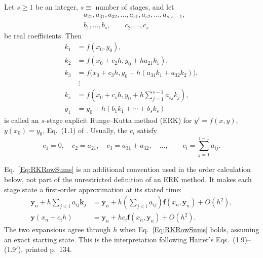 \begin{definition}
Let $s\geq1$ be an integer, $s\equiv$ number of stages, and let
\[
\begin{aligned}
 &a_{21},a_{31},a_{32},\dots,a_{s1},a_{s2},\dots,a_{s,s-1},\\
 &b_1,\dots,b_s,\qquad c_2,\dots,c_s
\end{aligned}
\]
be real coefficients. Then
\begin{equation}\label{Eq:ERKmethodsSthStage}
\begin{aligned}
 k_1&=f(x_0,y_0),\\
 k_2&=f(x_0+c_2h,y_0+ha_{21}k_1),\\
 k_3&=f\bigl(x_0+c_3h,y_0+h(a_{31}k_1+a_{32}k_2)\bigr),\\
 &\ \vdots\\
 k_s&=f\left(x_0+c_sh,y_0+h\sum_{j=1}^{s-1}a_{sj}k_j\right),\\
 y_1&=y_0+h(b_1k_1+\cdots+b_sk_s)
\end{aligned}
\end{equation}
is called an $s$-stage explicit Runge--Kutta method (ERK) for
$y'=f(x,y)$, $y(x_0)=y_0$, Eq.~(1.1) of \cite{HNW1993}.
Usually, the $c_i$ satisfy
\begin{equation}\label{Eq:RKRowSums}
 c_1=0,\quad c_2=a_{21},\quad c_3=a_{31}+a_{32},\quad\dots,
 \qquad c_i=\sum_{j=1}^{i-1}a_{ij}.
\end{equation}
\end{definition}

Eq.~\ref{Eq:RKRowSums} is an additional convention used in the order
calculation below, not part of the unrestricted definition of an ERK method.
It makes each stage state a first-order approximation at its stated time:
\begin{equation}\label{Eq:RKRowSumStageMatch}
\begin{aligned}
 \mathbf y_n+h\sum_{j<i}a_{ij}\mathbf k_j
   &=\mathbf y_n+h\left(\sum_{j<i}a_{ij}\right)
                       \mathbf f(x_n,\mathbf y_n)+O(h^2),\\
 \mathbf y(x_n+c_ih)
   &=\mathbf y_n+hc_i\mathbf f(x_n,\mathbf y_n)+O(h^2).
\end{aligned}
\end{equation}
The two expansions agree through $h$ when Eq.~\ref{Eq:RKRowSums} holds,
assuming an exact starting state. This is the interpretation following
Hairer's Eqs.~(1.9)--(1.9$'$), printed p.~134.

